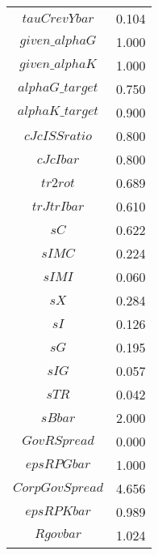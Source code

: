 \begin{center}
\begin{longtable}{cc}
$tauCrevYbar$ 	 & 	 0.104 \\
$given\_alphaG$ 	 & 	 1.000 \\
$given\_alphaK$ 	 & 	 1.000 \\
$alphaG\_target$ 	 & 	 0.750 \\
$alphaK\_target$ 	 & 	 0.900 \\
$cJcISSratio$ 	 & 	 0.800 \\
$cJcIbar$ 	 & 	 0.800 \\
$tr2rot$ 	 & 	 0.689 \\
$trJtrIbar$ 	 & 	 0.610 \\
$sC$ 	 & 	 0.622 \\
$sIMC$ 	 & 	 0.224 \\
$sIMI$ 	 & 	 0.060 \\
$sX$ 	 & 	 0.284 \\
$sI$ 	 & 	 0.126 \\
$sG$ 	 & 	 0.195 \\
$sIG$ 	 & 	 0.057 \\
$sTR$ 	 & 	 0.042 \\
$sBbar$ 	 & 	 2.000 \\
$GovRSpread$ 	 & 	 0.000 \\
$epsRPGbar$ 	 & 	 1.000 \\
$CorpGovSpread$ 	 & 	 4.656 \\
$epsRPKbar$ 	 & 	 0.989 \\
$Rgovbar$ 	 & 	 1.024 \\
\bottomrule%
\end{longtable}
\end{center}
